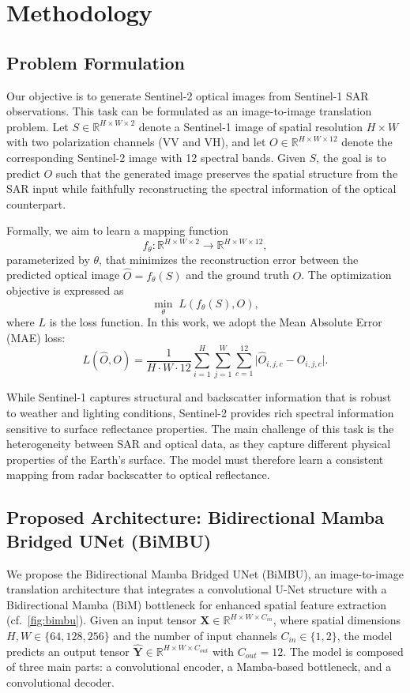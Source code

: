 \section{Methodology}\label{methodology}

\subsection{Problem Formulation}
Our objective is to generate Sentinel-2 optical images from Sentinel-1 SAR observations. This task can be formulated as an image-to-image translation problem. Let $S \in \mathbb{R}^{H \times W \times 2}$ denote a Sentinel-1 image of spatial resolution $H \times W$ with two polarization channels (VV and VH), and let $O \in \mathbb{R}^{H \times W \times 12}$ denote the corresponding Sentinel-2 image with 12 spectral bands. Given $S$, the goal is to predict $O$ such that the generated image preserves the spatial structure from the SAR input while faithfully reconstructing the spectral information of the optical counterpart.

Formally, we aim to learn a mapping function
\[
f_\theta : \mathbb{R}^{H \times W \times 2} \rightarrow \mathbb{R}^{H \times W \times 12},
\]
parameterized by $\theta$, that minimizes the reconstruction error between the predicted optical image $\hat{O} = f_\theta(S)$ and the ground truth $O$. The optimization objective is expressed as
\[
\min_{\theta} \; L(f_\theta(S), O),
\]
where $L$ is the loss function. In this work, we adopt the Mean Absolute Error (MAE) loss:
\[
L(\hat{O}, O) = \frac{1}{H \cdot W \cdot 12} \sum_{i=1}^{H} \sum_{j=1}^{W} \sum_{c=1}^{12} \big| \hat{O}_{i,j,c} - O_{i,j,c} \big|.
\]

While Sentinel-1 captures structural and backscatter information that is robust to weather and lighting conditions, Sentinel-2 provides rich spectral information sensitive to surface reflectance properties. The main challenge of this task is the heterogeneity between SAR and optical data, as they capture different physical properties of the Earth's surface. The model must therefore learn a consistent mapping from radar backscatter to optical reflectance.  



\subsection{Proposed Architecture: Bidirectional Mamba Bridged UNet (BiMBU)}
We propose the Bidirectional Mamba Bridged UNet (BiMBU), an image-to-image translation architecture that integrates a convolutional U-Net structure with a Bidirectional Mamba (BiM) bottleneck for enhanced spatial feature extraction (cf.~\ref{fig:bimbu}). Given an input tensor $\mathbf{X} \in \mathbb{R}^{H \times W \times C_{in}}$, where spatial dimensions $H, W \in \{64, 128, 256\}$ and the number of input channels $C_{in} \in \{1, 2\}$, the model predicts an output tensor $\mathbf{\hat{Y}} \in \mathbb{R}^{H \times W \times C_{out}}$ with $C_{out} = 12$. The model is composed of three main parts: a convolutional encoder, a Mamba-based bottleneck, and a convolutional decoder.

